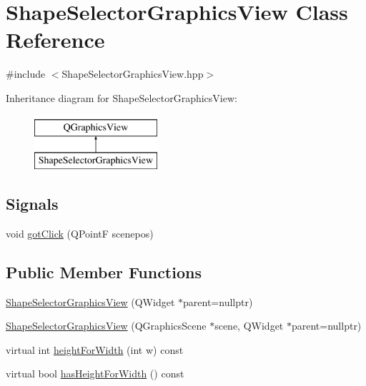 \hypertarget{class_shape_selector_graphics_view}{}\section{Shape\+Selector\+Graphics\+View Class Reference}
\label{class_shape_selector_graphics_view}


{\ttfamily \#include $<$Shape\+Selector\+Graphics\+View.\+hpp$>$}

Inheritance diagram for Shape\+Selector\+Graphics\+View\+:\begin{figure}[H]
\begin{center}
\leavevmode
\includegraphics[height=2.000000cm]{class_shape_selector_graphics_view}
\end{center}
\end{figure}
\subsection*{Signals}
\begin{DoxyCompactItemize}
\item 
void \hyperlink{class_shape_selector_graphics_view_ad071a85e73af645061bf1ea8007707b6}{got\+Click} (Q\+Point\+F scenepos)
\end{DoxyCompactItemize}
\subsection*{Public Member Functions}
\begin{DoxyCompactItemize}
\item 
\hyperlink{class_shape_selector_graphics_view_addc27cb99f515e97fb1c9dfd577ccda0}{Shape\+Selector\+Graphics\+View} (Q\+Widget $\ast$parent=nullptr)
\item 
\hyperlink{class_shape_selector_graphics_view_a5ed676b4b4215698bdff8c7959ec55d7}{Shape\+Selector\+Graphics\+View} (Q\+Graphics\+Scene $\ast$scene, Q\+Widget $\ast$parent=nullptr)
\item 
virtual int \hyperlink{class_shape_selector_graphics_view_aa2aa9700ee783cb4140b709ac4d72378}{height\+For\+Width} (int w) const 
\item 
virtual bool \hyperlink{class_shape_selector_graphics_view_a95354b0f1d0f40c7089d9ab7c07ff51f}{has\+Height\+For\+Width} () const 
\end{DoxyCompactItemize}
